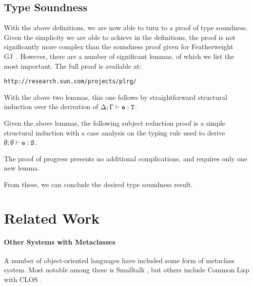 \documentclass[10pt]{acm-sigplan}
\begin{document}
\figComp



\subsection{Type Soundness}
\label{proof}

With the above definitions, we are now able to turn to a proof of type
soundness. Given the simplicity we are able to achieve in the
definitions, the proof is not significantly more complex than the
soundness proof given for Featherweight GJ\ \cite{FJ}.  However, there
are a number of significant lemmas, of which we list the most
important. The full proof is available at:

\vspace{.1cm}
\verb|http://research.sun.com/projects/plrg/|

\newpage
\fieldsPreservedLemma

\fieldsPreservedProof

\methodTypingLemma

\methodTypingProof

\substitutionPreservesTyping
\myProof With the above two lemmas, this one follows by
straightforward structural induction over the derivation of ${\Delta;\Gamma} \vdash {\ensuremath{{\mbox {\tt e}} : {\mathtt{{T}}}}}$.

\vspace{.3cm}

Given the above lemmas, the following subject reduction proof is a
simple structural induction with a case analysis on the typing rule
used to derive ${\emptyset;\emptyset} \vdash {\ensuremath {{\mbox {\tt e}} : {\mbox {\tt S}}}}$.

\preservation

\preservationProof

The proof of progress presents no additional complications, and
requires only one new lemma.

\fieldsAgreeLemma

\progress

\progressProof

From these, we can conclude the desired type soundness result.

\soundness

\soundnessProofShort


\section{Related Work}
\label{related}

\paragraph{Other Systems with Metaclasses}
A number of object-oriented languages have included some form of
metaclass system. Most notable among these is Smalltalk
\cite{Smalltalk80}, but others include Common Lisp with CLOS
\cite{ArtMOP}.
\end{document}
